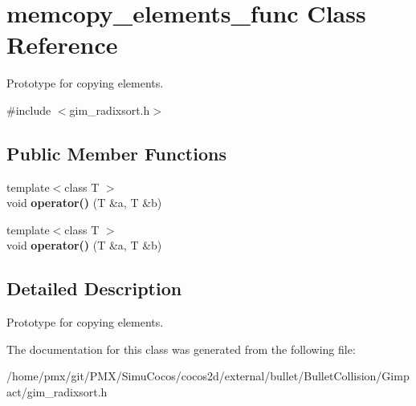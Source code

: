 \hypertarget{classmemcopy__elements__func}{}\section{memcopy\+\_\+elements\+\_\+func Class Reference}
\label{classmemcopy__elements__func}


Prototype for copying elements.  




{\ttfamily \#include $<$gim\+\_\+radixsort.\+h$>$}

\subsection*{Public Member Functions}
\begin{DoxyCompactItemize}
\item 
\mbox{\label{classmemcopy__elements__func_abf6c5cd888885be895cf5ab85b071b58}} 
{\footnotesize template$<$class T $>$ }\\void {\bfseries operator()} (T \&a, T \&b)
\item 
\mbox{\label{classmemcopy__elements__func_abf6c5cd888885be895cf5ab85b071b58}} 
{\footnotesize template$<$class T $>$ }\\void {\bfseries operator()} (T \&a, T \&b)
\end{DoxyCompactItemize}


\subsection{Detailed Description}
Prototype for copying elements. 

The documentation for this class was generated from the following file\+:\begin{DoxyCompactItemize}
\item 
/home/pmx/git/\+P\+M\+X/\+Simu\+Cocos/cocos2d/external/bullet/\+Bullet\+Collision/\+Gimpact/gim\+\_\+radixsort.\+h\end{DoxyCompactItemize}

